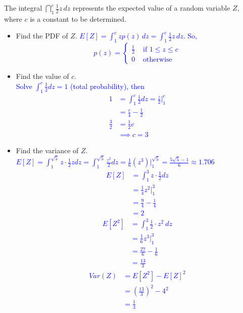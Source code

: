 \documentclass[10pt]{article}
\begin{document}
\begin{itemize}
\begin{itemize}
\end{itemize}

\exercise{} The integral $\dint_1^{c} \frac12z\,dz$ represents the expected value of a random variable $Z$, where $c$ is a constant to be determined.\\
\begin{itemize}
\item[(a)] Find the PDF of $Z$.
\textcolor{blue}{
$E[Z] = \int_1^{c} z p(z)\,dz = \int_1^{c} \frac12z\,dz$. So, 
\[
p(z) =
\begin{cases}
 \frac12  & \text{ if } 1 \le z \le c\\
 0 & \text{ otherwise}
\end{cases}
\]
}


\vfill

\item[(b)] Find the value of $c$.\\
\textcolor{blue}{
Solve $\int_1^c \frac12 dz = 1$ (total probability), then 
\begin{align*}
1 &= \int_1^c \frac12 dz = \frac{z}{2}\Big|_1^c \\
&= \frac{c}{4} - \frac12\\
\frac32 &= \frac12 c\\
&\implies c = 3
\end{align*}
}
\vfill

\item[(c)] Find the variance of $Z$.\\
\textcolor{blue}{
$E[Z] = \int_1^{\sqrt{5}} z \cdot \frac12 z dz = \int_1^{\sqrt{5}} \frac{z^2}{2} dz = \frac{1}{6}(z^3)|_1^{\sqrt{5}} = \frac{5\sqrt{5}-1}{6} \approx 1.706$
\begin{align*}
E[Z] &= \int_1^{3} z \cdot \frac12  dz\\
&= \frac{1}{4}z^2|_1^{3}\\
&= \frac94 - \frac14\\
&=2
\end{align*}
\begin{align*}
E[Z^2] &= \int_1^{3} \frac12 \cdot z^2 \ dz\\
&= \frac{1}{6} z^3|_1^{3}\\
&= \frac{27}{6} - \frac16\\
&= \frac{13}{3}
\end{align*}
\begin{align*}
Var(Z) &= E[Z^2] - E[Z]^2 \\
&= \left(\frac{13}{3}\right)^2 - 4^2\\
&= \frac13
\end{align*}
}
\end{itemize}


\end{itemize}
\end{document}
